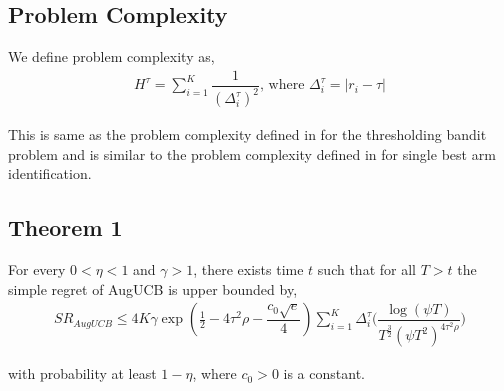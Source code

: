 

\subsection{Problem Complexity}

We define problem complexity as,
\begin{align*}
H^{\tau} = \sum_{i=1}^{K}\dfrac{1}{(\Delta_{i}^{\tau})^{2}} \text{, where } \Delta_{i}^{\tau}=|r_{i}-\tau|
\end{align*}

This is same as the problem complexity defined in \cite{locatelli2016optimal} for the thresholding bandit problem and is similar to the problem complexity defined in \cite{audibert2010best} for single best arm identification.


\subsection{Theorem 1}

\begin{theorem}
\label{Result:Theorem:1}

For every $0<\eta <1$ and $\gamma > 1$, there exists time $t$ such that for all $T>t$ the simple regret of AugUCB is upper bounded by,
\begin{align*}
SR_{AugUCB} \leq 4K \gamma \exp(\frac{1}{2}- 4\tau^{2}\rho -\dfrac{c_{0}\sqrt{e}}{4}) \sum_{i=1}^{K} \Delta_{i}^{\tau} \bigg(\dfrac{\log (\psi T )}{T^{\frac{3}{2}}(\psi T^2)^{4\tau^{2}\rho}}\bigg)
\end{align*}

with probability at least $1-\eta$, where $c_{0}>0$ is a constant.

\end{theorem}


